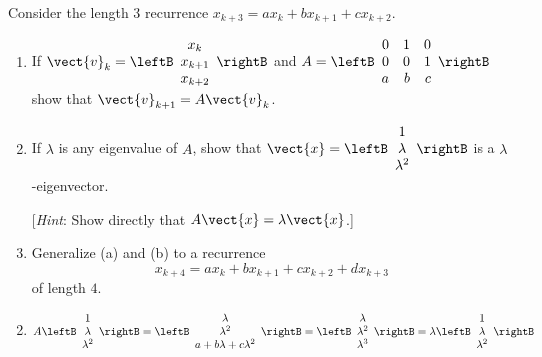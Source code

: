 \begin{multicols}{2}
\begin{ex}
Consider the length $3$ recurrence \newline $x_{k+3} = ax_{k} + bx_{k+1} + cx_{k+2}$.

\begin{enumerate}[label={\alph*.}]
\item If $\vect{v}_k = \leftB \begin{array}{c}
x_k \\
x_{k+1} \\
x_{k+2}
\end{array}\rightB$
 and $A = \leftB \begin{array}{rrr}
0 & 1 & 0 \\
0 & 0 & 1 \\
a & b & c
\end{array}\rightB$
 show that $\vect{v}_{k+1} = A\vect{v}_{k}$.

\item If $\lambda$ is any eigenvalue of $A$, show that $\vect{x} = \leftB \begin{array}{c}
1 \\
\lambda \\
\lambda^2
\end{array}\rightB$
 is a $\lambda$-eigenvector.


[\textit{Hint}: Show directly that $A\vect{x} = \lambda\vect{x}$.]

\item Generalize (a) and (b) to a recurrence 
\begin{equation*}
x_{k+4} = ax_{k} + bx_{k+1} + cx_{k+2} + dx_{k+3}
\end{equation*}
of length $4$.

\end{enumerate}
\begin{sol}
\begin{enumerate}[label={\alph*.}]
\setcounter{enumi}{1}
\item  $ A \leftB \begin{array}{c}
1 \\
\lambda \\
\lambda^2 
\end{array}\rightB = \leftB \begin{array}{c}
\lambda \\
\lambda^2 \\
a + b\lambda + c\lambda^2 \end{array}\rightB = \leftB \begin{array}{c}
\lambda \\
\lambda^2 \\
\lambda^3 
\end{array}\rightB = \lambda
\leftB \begin{array}{c}
1 \\
\lambda \\
\lambda^2 
\end{array}\rightB$
\end{enumerate}
\end{sol}
\end{ex}


\end{multicols}
